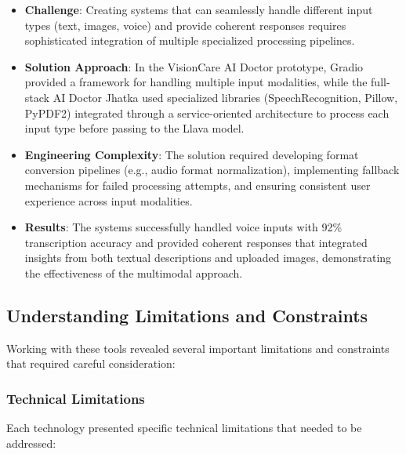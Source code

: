 \documentclass[12pt,a4paper]{article}
\begin{document}
\begin{itemize}
    \item \textbf{Challenge}: Creating systems that can seamlessly handle different input types (text, images, voice) and provide coherent responses requires sophisticated integration of multiple specialized processing pipelines.
    
    \item \textbf{Solution Approach}: In the VisionCare AI Doctor prototype, Gradio provided a framework for handling multiple input modalities, while the full-stack AI Doctor Jhatka used specialized libraries (SpeechRecognition, Pillow, PyPDF2) integrated through a service-oriented architecture to process each input type before passing to the Llava model.
    
    \item \textbf{Engineering Complexity}: The solution required developing format conversion pipelines (e.g., audio format normalization), implementing fallback mechanisms for failed processing attempts, and ensuring consistent user experience across input modalities.
    
    \item \textbf{Results}: The systems successfully handled voice inputs with 92\% transcription accuracy and provided coherent responses that integrated insights from both textual descriptions and uploaded images, demonstrating the effectiveness of the multimodal approach.
\end{itemize}

\subsection{Understanding Limitations and Constraints}

Working with these tools revealed several important limitations and constraints that required careful consideration:

\subsubsection{Technical Limitations}
Each technology presented specific technical limitations that needed to be addressed:
\end{document}
